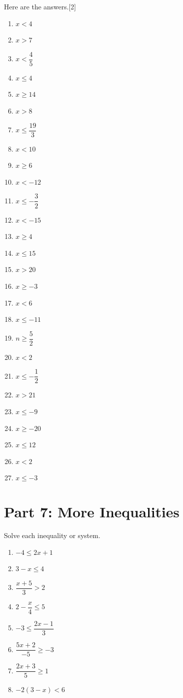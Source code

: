 \documentclass[10pt]{article}
\theoremstyle{definition}
\theoremstyle{plain}
\numberwithin{equation}{section}
\begin{document}
\begin{subanswer}
  \begin{multicolblock}{Here are the answers.}[2]
  \begin{enumerate}
    \item $x < 4$
    \item $x > 7$
    \item $x < \dfrac{4}{5}$
    \item $x \le 4$
    \item $x \ge 14$
    \item $x > 8$
    \item $x \le \dfrac{19}{3}$
    \item $x < 10$
    \item $x \ge 6$
    \item $x < -12$
    \item $x \le -\dfrac{3}{2}$
    \item $x < -15$
    \item $x \ge 4$
    \item $x \le 15$
    \item $x > 20$
    \item $x \ge -3$
    \item $x < 6$
    \item $x \le -11$
    \item $n \ge \dfrac{5}{2}$
    \item $x < 2$
    \item $x \le -\dfrac{1}{2}$
    \item $x > 21$
    \item $x \le -9$
    \item $x \ge -20$
    \item $x \le 12$
    \item $x < 2$
    \item $x \le -3$
  \end{enumerate}
  \end{multicolblock}
\end{subanswer}



\newpage

\section*{Part 7: More Inequalities}
\begin{multicolblock}{Solve each inequality or system.}
\begin{enumerate}
  \item $-4 \le 2x + 1$
  \item $3 - x \le 4$
  \item $\dfrac{x+5}{3} > 2$
  \item $2 - \dfrac{x}{4} \le 5$
  \item $-3 \le \dfrac{2x-1}{3}$
  \item $\dfrac{5x+2}{-5} \ge -3$
  \item $\dfrac{2x+3}{5} \ge 1$
  \item $-2(3 - x) < 6$
\end{enumerate}
\end{multicolblock}
\end{document}
